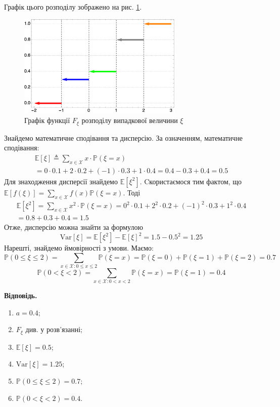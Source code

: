 \documentclass[14pt]{extarticle}
\begin{document}
Графік цього розподілу зображено на рис. \ref{fig:1}.
\begin{figure}[H]
    \centering
    \includegraphics[width=0.7\textwidth]{images/test_2/distribution_plot.png}
    \caption{Графік функції $F_{\xi}$ розподілу випадкової величини $\xi$}
    \label{fig:1}
\end{figure}

Знайдемо математичне сподівання та дисперсію. За означенням, математичне сподівання:
\begin{gather*}
\mathbb{E}[\xi] \triangleq \sum_{x \in \mathcal{X}} x \cdot \mathbb{P}(\xi=x) \\
= 0 \cdot 0.1 + 2 \cdot 0.2 + (-1) \cdot 0.3 + 1 \cdot 0.4 = 0.4-0.3+0.4=0.5
\end{gather*}
Для знаходження дисперсії знайдемо $\mathbb{E}[\xi^2]$. Cкористаємося тим фактом, що $\mathbb{E}[f(\xi)] = \sum_{x \in \mathcal{X}}f(x)\mathbb{P}(\xi=x)$. Тоді
\begin{gather*}
\mathbb{E}[\xi^2] = \sum_{x \in \mathcal{X}} x^2 \cdot \mathbb{P}(\xi=x) 
= 0^2 \cdot 0.1 + 2^2 \cdot 0.2 + (-1)^2 \cdot 0.3 + 1^2 \cdot 0.4 \\
= 0.8 + 0.3 + 0.4 = 1.5
\end{gather*}
Отже, дисперсію можна знайти за формулою
\[
\text{Var}[\xi] = \mathbb{E}[\xi^2]-\mathbb{E}[\xi]^2 = 1.5 - 0.5^2 = 1.25
\]
Нарешті, знайдемо ймовірності з умови. Маємо:
\[
\mathbb{P}(0 \leq \xi \leq 2) = \sum_{x \in \mathcal{X}: 0 \leq x \leq 2}\mathbb{P}(\xi=x) = \mathbb{P}(\xi=0)+\mathbb{P}(\xi=1) + \mathbb{P}(\xi=2)=0.7
\]
\[
\mathbb{P}(0 < \xi < 2) = \sum_{x \in \mathcal{X}: 0 < x < 2} \mathbb{P}(\xi=x) = \mathbb{P}(\xi=1) = 0.4
\]

\textbf{Відповідь.}
\begin{enumerate}
    \item $a=0.4$;
    \item $F_{\xi}$ див. у розв'язанні;
    \item $\mathbb{E}[\xi]=0.5$;
    \item $\text{Var}[\xi]=1.25$;
    \item $\mathbb{P}(0 \leq \xi \leq 2) = 0.7$;
    \item $\mathbb{P}(0 < \xi < 2) = 0.4$.
\end{enumerate}
\end{document}
